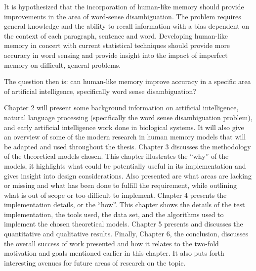 It is hypothesized that the incorporation of human-like memory should provide
improvements in the area of word-sense disambiguation. The problem requires
general knowledge and the ability to recall information with a bias dependent on
the context of each paragraph, sentence and word.  Developing human-like memory
in concert with current statistical techniques should provide more accuracy in
word sensing and provide insight into the impact of imperfect memory on
difficult, general problems.

The question then is: can human-like memory improve accuracy in a specific area
of artificial intelligence, specifically word sense disambiguation?

Chapter 2 will present some background information on artificial intelligence,
natural language processing (specifically the word sense disambiguation
problem), and early artificial intelligence work done in biological systems. It
will also give an overview of some of the modern research in human memory models
that will be adapted and used throughout the thesis.  Chapter 3 discusses the
methodology of the theoretical models chosen. This chapter illustrates the
``why'' of the models, it highlights what could be potentially useful in its
implementation and gives insight into design considerations.  Also presented are
what areas are lacking or missing and what has been done to fulfill the
requirement, while outlining what is out of scope or too difficult to implement.
Chapter 4 presents the implementation details, or the ``how''.  This chapter
shows the details of the test implementation, the tools used, the data set, and
the algorithms used to implement the chosen theoretical models.  Chapter 5
presents and discusses the quantitative and qualitative results. Finally,
Chapter 6, the conclusion, discusses the overall success of work presented and
how it relates to the two-fold motivation and goals mentioned earlier in this
chapter. It also puts forth interesting avenues for future areas of research on
the topic.
